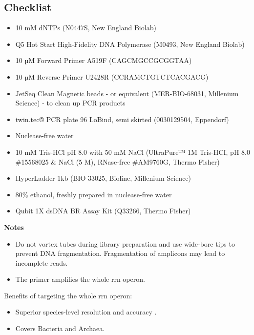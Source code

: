 \documentclass[
]{book}
\providecommand{\tightlist}{%
  \setlength{\itemsep}{0pt}\setlength{\parskip}{0pt}}
\begin{document}
\subsection{Checklist}\label{checklist-1}

\begin{itemize}
\tightlist
\item
  10 mM dNTPs (N0447S, New England Biolab)
\item
  Q5 Hot Start High-Fidelity DNA Polymerase (M0493, New England Biolab)
\item
  10 µM Forward Primer A519F (CAGCMGCCGCGGTAA) \citep{Martijn2019}
\item
  10 µM Reverse Primer U2428R (CCRAMCTGTCTCACGACG) \citep{Martijn2019}
\item
  JetSeq Clean Magnetic beads - or equivalent (MER-BIO-68031, Millenium Science) - to clean up PCR products\\
\item
  twin.tec® PCR plate 96 LoBind, semi skirted (0030129504, Eppendorf)\\
\item
  Nuclease-free water
\item
  10 mM Tris-HCl pH 8.0 with 50 mM NaCl (UltraPure™ 1M Tris-HCI, pH 8.0 \#15568025 \& NaCl (5 M), RNase-free \#AM9760G, Thermo Fisher)\\
\item
  HyperLadder 1kb (BIO-33025, Bioline, Millenium Science)
\item
  80\% ethanol, freshly prepared in nuclease-free water
\item
  Qubit 1X dsDNA BR Assay Kit (Q33266, Thermo Fisher)
\end{itemize}

\textbf{Notes}

\begin{itemize}
\tightlist
\item
  Do not vortex tubes during library preparation and use wide-bore tips to prevent DNA fragmentation. Fragmentation of amplicons may lead to incomplete reads.\\
\item
  The primer amplifies the whole rrn operon.
\end{itemize}

Benefits of targeting the whole rrn operon:

\begin{itemize}
\tightlist
\item
  Superior species-level resolution and accuracy \citep{Cusco2018, Srinivas2024}.\\
\item
  Covers Bacteria and Archaea.
\end{itemize}
\end{document}
